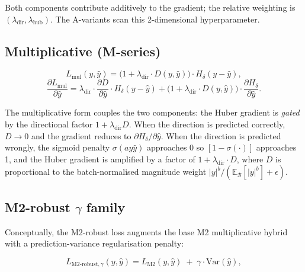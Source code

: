 Both components contribute additively to the gradient; the relative weighting is $(\lambda_{\mathrm{dir}}, \lambda_{\mathrm{hub}})$. The A-variants scan this 2-dimensional hyperparameter.

\subsection{Multiplicative (M-series)}

\label{subsec:multiplicative}

\begin{equation}
L_{\mathrm{mul}}(y, \hat y) = \big(1 + \lambda_{\mathrm{dir}} \cdot D(y, \hat y)\big) \cdot H_\delta(y - \hat y),
\end{equation}
\begin{equation}
\frac{\partial L_{\mathrm{mul}}}{\partial \hat y}
= \lambda_{\mathrm{dir}} \cdot \frac{\partial D}{\partial \hat y} \cdot H_\delta(y - \hat y)
+ \big(1 + \lambda_{\mathrm{dir}} \cdot D(y, \hat y)\big) \cdot \frac{\partial H_\delta}{\partial \hat y}.
\end{equation}

The multiplicative form couples the two components: the Huber gradient is \emph{gated} by the directional factor $1 + \lambda_{\mathrm{dir}} D$. When the direction is predicted correctly, $D \to 0$ and the gradient reduces to $\partial H_\delta / \partial \hat y$. When the direction is predicted wrongly, the sigmoid penalty $\sigma(ay\hat y)$ approaches 0 so $[1-\sigma(\cdot)]$ approaches 1, and the Huber gradient is amplified by a factor of $1 + \lambda_{\mathrm{dir}} \cdot D$, where $D$ is proportional to the batch-normalised magnitude weight $|y|^b / (\mathbb{E}_{\mathcal{B}}[|y|^b]+\epsilon)$.

\subsection{M2-robust \texorpdfstring{$\gamma$}{gamma} family}

\label{subsec:m2-robust}

Conceptually, the M2-robust loss augments the base M2 multiplicative hybrid with a prediction-variance regularisation penalty:

\begin{equation}
L_{\mathrm{M2\text{-}robust},\gamma}(y, \hat y) = L_{\mathrm{M2}}(y, \hat y) \;+\; \gamma \cdot \mathrm{Var}(\hat y),
\end{equation}

